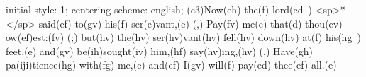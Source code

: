 initial-style: 1;
centering-scheme: english;
(c3)Now(eh) the(f) lord(ed~) <sp>*</sp> said(ef) to(gv) his(f) ser(e)vant,(e) (,) Pay(fv) me(e) that(d) thou(ev) ow(ef)est:(fv) (;) but(hv) the(hv) ser(hv)vant(hv) fell(hv) down(hv) at(f) his(hg~) feet,(e) and(gv) be(ih)sought(iv) him,(hf) say(hv)ing,(hv) (,) Have(gh) pa(iji)tience(hg) with(fg) me,(e) and(ef) I(gv) will(f) pay(ed) thee(ef) all.(e)
